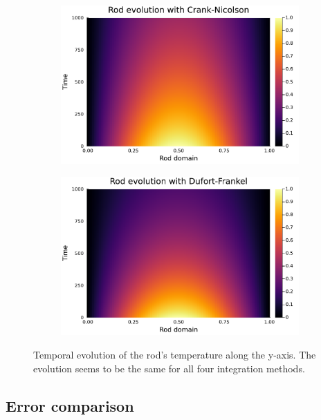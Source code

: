 \documentclass[
	a4paper, %
	10pt, %
]{CSUniSchoolLabReport}
\begin{document}
\begin{figure}[H]
\begin{subfigure}[b]{0.49\textwidth}
	\end{subfigure}
	\hfill
	\begin{subfigure}[b]{0.49\textwidth}
		\includegraphics[width=\textwidth]{../saves_t2/rod_crank_nic.pdf}
	\end{subfigure}
	\hfill
	\begin{subfigure}[b]{0.49\textwidth}
		\includegraphics[width=\textwidth]{../saves_t2/rod_dufort_frankel.pdf}
	\end{subfigure}
	\hfill
	\caption{Temporal evolution of the rod's temperature along the y-axis. The evolution seems to be the same for all four integration methods.}
	\label{fig:comp_diff_integ}
\end{figure}

\subsection{Error comparison}
\end{document}
